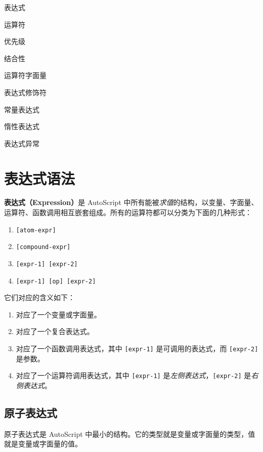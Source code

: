 \begin{introduction}
    \item 表达式
    \item 运算符
    \item 优先级
    \item 结合性
    \item 运算符字面量
    \item 表达式修饰符
    \item 常量表达式
    \item 惰性表达式
    \item 表达式异常
\end{introduction}

\section{表达式语法}

\textbf{表达式（Expression）}是 AutoScript 中所有能被\emph{求值}的结构，以变量、字面量、运算符、函数调用相互嵌套组成。所有的运算符都可以分类为下面的几种形式：

\begin{grammar}[表达式] \label{grm:expression}
\begin{enumerate}
	\item \texttt{[atom-expr]}
	\item \texttt{[compound-expr]}
	\item \texttt{[expr-1] [expr-2]}
	\item \texttt{[expr-1] [op] [expr-2]}
\end{enumerate}
\end{grammar}

它们对应的含义如下：

\begin{enumerate}
	\item 对应了一个变量或字面量。
	\item 对应了一个复合表达式。
	\item 对应了一个函数调用表达式，其中 \texttt{[expr-1]} 是可调用的表达式，而 \texttt{[expr-2]} 是参数。
	\item 对应了一个运算符调用表达式，其中 \texttt{[expr-1]} 是\emph{左侧表达式}，\texttt{[expr-2]} 是\emph{右侧表达式}。
\end{enumerate}

\subsection{原子表达式}

原子表达式是 AutoScript 中最小的结构。它的类型就是变量或字面量的类型，值就是变量或字面量的值。

